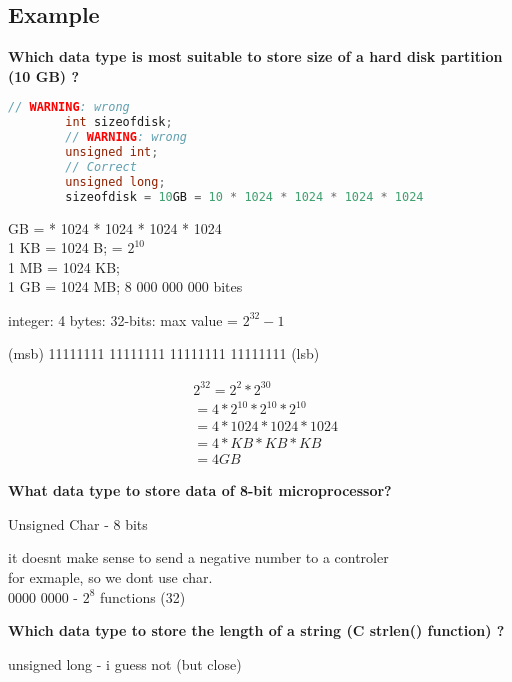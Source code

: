 \documentclass[12pt]{article}
\begin{document}
\begin{enumerate}
		\subsection{Example}%
		\label{sub:Example}

		\textbf{Which data type is most suitable to store size of a hard disk partition (10 GB) ? }


	\begin{lstlisting}[language=C, title=example of memory alocation]
		// WARNING: wrong
		int sizeofdisk;
		// WARNING: wrong
		unsigned int;
		// Correct
		unsigned long;
		sizeofdisk = 10GB = 10 * 1024 * 1024 * 1024 * 1024
	\end{lstlisting}

	\vspace{10mm}

	GB = * 1024 * 1024 * 1024 * 1024 \\
	1 KB = 1024 B; = $2 ^ {10}$ \\
	1 MB = 1024 KB; \\ 
	1 GB = 1024 MB; 8 000 000 000 bites

	\vspace{10mm}


	integer: 4 bytes: 32-bits: max value = $2^32 - 1$ 

	(msb) 11111111 11111111 11111111 11111111 (lsb)

	\begin{align}
		&2 ^ {32} = 2 ^2 * 2 ^ {30} \\
		&= 4 * 2^{10} * 2^{10} * 2^{10}\\
		&= 4 * 1024 * 1024 * 1024\\
		&= 4 * KB * KB * KB \\
		&= 4 GB
	\end{align}

	\newpage

	\textbf{What data type to store data of 8-bit microprocessor?}

	Unsigned Char - 8 bits

	it doesnt make sense to send a negative number to a controler \\ for exmaple, 
	so we dont use char. \\
	0000 0000 - $ 2^ 8$ functions (32)

	\vspace{10mm}

	\textbf{Which data type to store the length of a string (C strlen() function) ?}

	unsigned long - i guess not (but close)


\end{enumerate}
\end{document}
